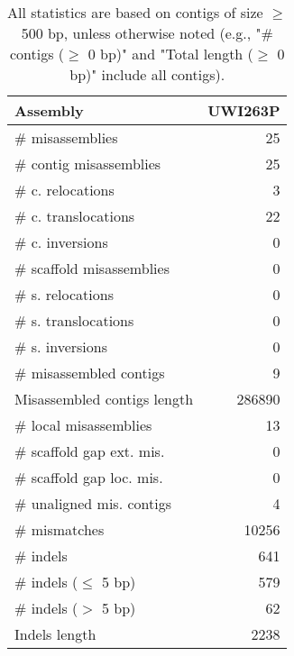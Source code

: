 \documentclass[12pt,a4paper]{article}
\begin{document}
\begin{table}[ht]
\begin{center}
\caption{All statistics are based on contigs of size $\geq$ 500 bp, unless otherwise noted (e.g., "\# contigs ($\geq$ 0 bp)" and "Total length ($\geq$ 0 bp)" include all contigs).}
\begin{tabular}{|l*{1}{|r}|}
\hline
Assembly & UWI263P \\ \hline
\# misassemblies & 25 \\ \hline
\hspace{2mm}\# contig misassemblies & 25 \\ \hline
\hspace{5mm}\# c. relocations & 3 \\ \hline
\hspace{5mm}\# c. translocations & 22 \\ \hline
\hspace{5mm}\# c. inversions & 0 \\ \hline
\hspace{2mm}\# scaffold misassemblies & 0 \\ \hline
\hspace{5mm}\# s. relocations & 0 \\ \hline
\hspace{5mm}\# s. translocations & 0 \\ \hline
\hspace{5mm}\# s. inversions & 0 \\ \hline
\# misassembled contigs & 9 \\ \hline
Misassembled contigs length & 286890 \\ \hline
\# local misassemblies & 13 \\ \hline
\# scaffold gap ext. mis. & 0 \\ \hline
\# scaffold gap loc. mis. & 0 \\ \hline
\# unaligned mis. contigs & 4 \\ \hline
\# mismatches & 10256 \\ \hline
\# indels & 641 \\ \hline
\hspace{5mm}\# indels ($\leq$ 5 bp) & 579 \\ \hline
\hspace{5mm}\# indels ($>$ 5 bp) & 62 \\ \hline
Indels length & 2238 \\ \hline
\end{tabular}
\end{center}
\end{table}
\end{document}
